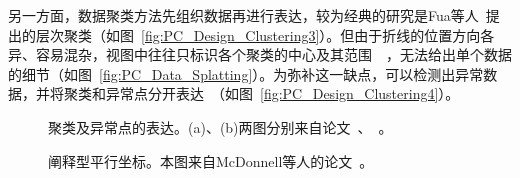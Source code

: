\documentclass[12pt,twocolumn]{article}
\begin{document}
另一方面，数据聚类方法先组织数据再进行表达，较为经典的研究是Fua等人~\citep{fua1999hierarchical}提出的层次聚类（如图~\ref{fig:PC_Design_Clustering3}）。但由于折线的位置方向各异、容易混杂，视图中往往只标识各个聚类的中心及其范围~\citep{siirtola2000direct}~\citep{rosenbaum2012progressive}，无法给出单个数据的细节（如图~\ref{fig:PC_Data_Splatting}）。为弥补这一缺点，可以检测出异常数据，并将聚类和异常点分开表达~\citep{novotny2006outlier}（如图~\ref{fig:PC_Design_Clustering4}）。

\begin{figure}[!htb]
\centering
{}
\caption{聚类及异常点的表达。(a)、(b)两图分别来自论文~\citep{fua1999hierarchical}、~\citep{novotny2006outlier}。}
\end{figure}

\begin{figure}[!htb]
\centering
{}
\caption{阐释型平行坐标。本图来自McDonnell等人的论文~\citep{mcdonnell2008illustrative}。}
\end{figure}
\end{document}
